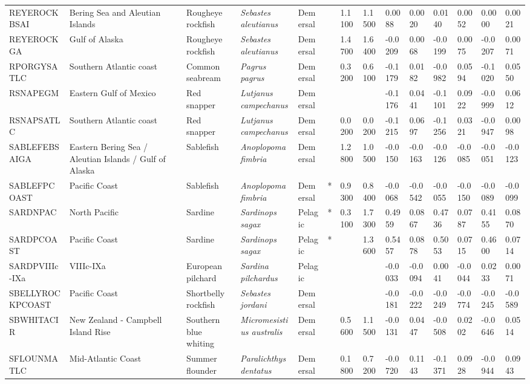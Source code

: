\begin{longtable}{p{2.6cm}p{1.9cm}p{1.7cm}p{1.6cm}p{1cm}p{0.3cm}p{1cm}p{1cm}p{1cm}p{1.1cm}p{1cm}p{1.1cm}p{1cm}p{1.1cm}}
  REYEROCKBSAI & Bering Sea and Aleutian Islands & Rougheye rockfish & \textit{Sebastes aleutianus} & Demersal &   & 1.1100 & 1.1500 & 0.0088 & 0.0020 & 0.0140 & 0.0052 & 0.0000 & 0.0021 \\ 
  REYEROCKGA & Gulf of Alaska & Rougheye rockfish & \textit{Sebastes aleutianus} & Demersal &   & 1.4700 & 1.6400 & -0.0209 & 0.0068 & -0.0199 & 0.0075 & -0.0207 & 0.0071 \\ 
  RPORGYSATLC & Southern Atlantic coast & Common seabream & \textit{Pagrus pagrus} & Demersal &   & 0.3200 & 0.6100 & -0.1179 & 0.0182 & -0.0982 & 0.0594 & -0.1020 & 0.0550 \\ 
  RSNAPEGM & Eastern Gulf of Mexico & Red snapper & \textit{Lutjanus campechanus} & Demersal &  &  &  & -0.1176 & 0.0441 & -0.1101 & 0.0922 & -0.0999 & 0.0612 \\ 
  RSNAPSATLC & Southern Atlantic coast & Red snapper & \textit{Lutjanus campechanus} & Demersal &   & 0.0200 & 0.0200 & -0.1215 & 0.0697 & -0.1256 & 0.0321 & -0.0947 & 0.0098 \\ 
  SABLEFEBSAIGA & Eastern Bering Sea / Aleutian Islands / Gulf of Alaska & Sablefish & \textit{Anoplopoma fimbria} & Demersal &   & 1.2800 & 1.0500 & -0.0150 & -0.0163 & -0.0126 & -0.0085 & -0.0051 & -0.0123 \\ 
  SABLEFPCOAST & Pacific Coast & Sablefish & \textit{Anoplopoma fimbria} & Demersal & * & 0.9300 & 0.8400 & -0.0068 & -0.0542 & -0.0055 & -0.0150 & -0.0089 & -0.0099 \\ 
  SARDNPAC & North Pacific & Sardine & \textit{Sardinops sagax} & Pelagic & * & 0.3100 & 1.7300 & 0.4959 & 0.0867 & 0.4736 & 0.0787 & 0.4155 & 0.0870 \\ 
  SARDPCOAST & Pacific Coast & Sardine & \textit{Sardinops sagax} & Pelagic & * &  & 1.3600 & 0.5457 & 0.0878 & 0.5053 & 0.0715 & 0.4600 & 0.0714 \\ 
  SARDPVIIIc-IXa & VIIIc-IXa & European pilchard & \textit{Sardina pilchardus} & Pelagic &  &  &  & -0.0033 & -0.0094 & 0.0041 & -0.0044 & 0.0233 & 0.0071 \\ 
  SBELLYROCKPCOAST & Pacific Coast & Shortbelly rockfish & \textit{Sebastes jordani} & Demersal &  &  &  & -0.0181 & -0.0222 & -0.0249 & -0.0774 & -0.0245 & -0.0589 \\ 
  SBWHITACIR & New Zealand - Campbell Island Rise & Southern blue whiting & \textit{Micromesistius australis} & Demersal &   & 0.5600 & 1.1500 & -0.0131 & 0.0447 & -0.0508 & 0.0202 & -0.0646 & 0.0514 \\ 
  SFLOUNMATLC & Mid-Atlantic Coast & Summer flounder & \textit{Paralichthys dentatus} & Demersal &   & 0.1800 & 0.7200 & -0.0720 & 0.1143 & -0.1371 & 0.0928 & -0.0944 & 0.0943 \\ 

\end{longtable}
